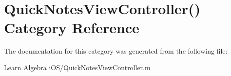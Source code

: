 \hypertarget{category_quick_notes_view_controller_07_08}{\section{Quick\-Notes\-View\-Controller() Category Reference}
\label{category_quick_notes_view_controller_07_08}
}


The documentation for this category was generated from the following file\-:\begin{DoxyCompactItemize}
\item 
Learn Algebra i\-O\-S/Quick\-Notes\-View\-Controller.\-m\end{DoxyCompactItemize}
